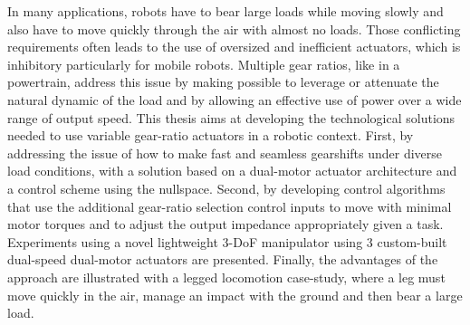 In many applications, robots have to bear large loads while moving slowly and also have to move quickly through the air with almost no loads. Those conflicting requirements often leads to the use of oversized and inefficient actuators, which is inhibitory particularly for mobile robots. Multiple gear ratios, like in a powertrain, address this issue by making possible to leverage or attenuate the natural dynamic of the load and by allowing an effective use of power over a wide range of output speed. This thesis aims at developing the technological solutions needed to use variable gear-ratio actuators in a robotic context. First, by addressing the issue of how to make fast and seamless gearshifts under diverse load conditions, with a solution based on a dual-motor actuator architecture and a control scheme using the nullspace. Second, by developing control algorithms that use the additional gear-ratio selection control inputs to move with minimal motor torques and to adjust the output impedance appropriately given a task. Experiments using a novel lightweight 3-DoF manipulator using 3 custom-built dual-speed dual-motor actuators are presented. Finally, the advantages of the approach are illustrated with a legged locomotion case-study, where a leg must move quickly in the air, manage an impact with the ground and then bear a large load.
